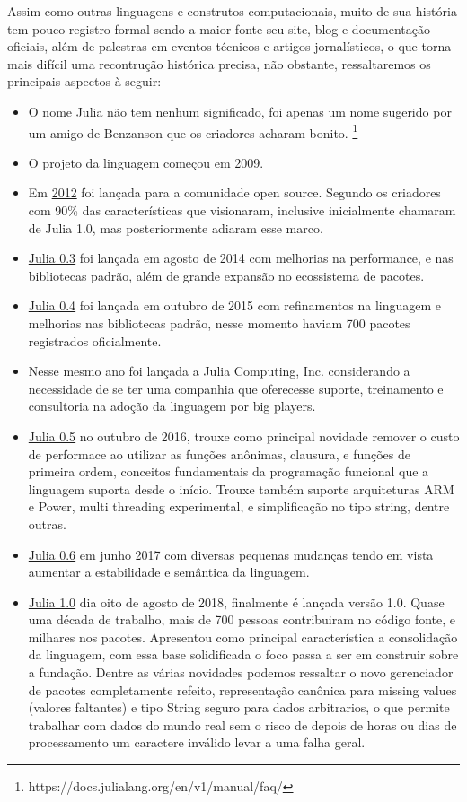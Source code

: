 Assim como outras linguagens e construtos computacionais, muito de sua história tem pouco registro formal sendo a maior fonte seu site, blog e documentação oficiais, além de palestras em eventos técnicos e artigos jornalísticos, o que torna mais difícil uma recontrução histórica precisa, não obstante, ressaltaremos os principais aspectos à seguir: 
\begin{itemize}
   \item O nome Julia não tem nenhum significado, foi apenas um nome sugerido por um amigo de Benzanson que os criadores acharam bonito. \footnote{https://docs.julialang.org/en/v1/manual/faq/}
   \item O projeto da linguagem começou em 2009.
   \item Em \href{https://julialang.org/blog/2012/02/why-we-created-julia/}{2012} foi lançada para a comunidade open source. Segundo os criadores com 90\% das características que visionaram, inclusive inicialmente chamaram de Julia 1.0, mas posteriormente adiaram esse marco. 
   \item \href{https://julialang.org/blog/2014/08/julia-0.3-release/}{Julia 0.3} foi lançada em agosto de 2014 com melhorias na performance, e nas bibliotecas padrão, além de grande expansão no ecossistema de pacotes. 
   \item \href{https://julialang.org/blog/2015/10/julia-0.4-release/}{Julia 0.4} foi lançada em outubro de 2015 com refinamentos na linguagem e melhorias nas bibliotecas padrão, nesse momento haviam 700 pacotes registrados oficialmente.
   \item Nesse mesmo ano foi lançada a Julia Computing, Inc. considerando a necessidade de se ter uma companhia que oferecesse suporte, treinamento e consultoria na adoção da linguagem por big players. 
   \item \href{https://julialang.org/blog/2016/10/julia-0.5-release/}{Julia 0.5} no outubro de 2016, trouxe como principal novidade remover o custo de performace ao utilizar as funções anônimas, clausura, e funções de primeira ordem, conceitos fundamentais da programação funcional que a linguagem suporta desde o início. Trouxe também suporte arquiteturas ARM e Power, multi threading experimental, e simplificação no tipo string, dentre outras. 
   \item \href{https://julialang.org/blog/2017/06/julia-0.6-release/}{Julia 0.6} em junho 2017 com diversas pequenas mudanças tendo em vista aumentar a estabilidade e semântica da linguagem. 
   \item \href{https://julialang.org/blog/2018/08/one-point-zero/}{Julia 1.0}  dia oito de agosto de 2018, finalmente é lançada versão 1.0. Quase uma década de trabalho, mais de 700 pessoas contribuiram no código fonte, e milhares nos pacotes. Apresentou como principal característica a consolidação da linguagem, com essa base solidificada o foco passa a ser em construir sobre a fundação. Dentre as várias novidades podemos ressaltar o novo gerenciador de pacotes completamente refeito, representação canônica para missing values (valores faltantes) e tipo String seguro para dados arbitrarios, o que permite trabalhar com dados do mundo real sem o risco de depois de horas ou dias de processamento um caractere inválido levar a uma falha geral. 

\end{itemize}
